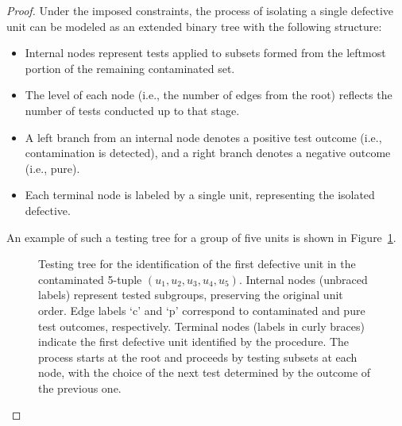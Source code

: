 \documentclass[12pt]{article}
\begin{document}
\begin{proof}
Under the imposed constraints, the process of isolating a single defective unit can be modeled as an extended binary tree with the following structure:
\begin{itemize}
    \item Internal nodes represent tests applied to subsets formed from the leftmost portion of the remaining contaminated set.
    \item The level of each node (i.e., the number of edges from the root) reflects the number of tests conducted up to that stage.
    \item A left branch from an internal node denotes a positive test outcome (i.e., contamination is detected), and a right branch denotes a negative outcome (i.e., pure).
    \item Each terminal node is labeled by a single unit, representing the isolated defective.
\end{itemize}




An example of such a testing tree for a group of five units is shown in Figure~\ref{fig:testing_tree_example2}.

\begin{figure}[ht!]
    \centering
    \caption{Testing tree for the identification of the first defective unit in the contaminated 5-tuple
$(u_1, u_2, u_3, u_4, u_5)$.
Internal nodes (unbraced labels) represent tested subgroups, preserving the original unit order. Edge labels ‘c’ and ‘p’ correspond to contaminated and pure test outcomes, respectively.
Terminal nodes (labels in curly braces) indicate the first defective unit identified by the procedure. The process starts at the root and proceeds by testing subsets at each node, with the choice of the next test determined by the outcome of the previous one.
    }
    \label{fig:testing_tree_example2}
\end{figure}


\end{proof}
\end{document}
